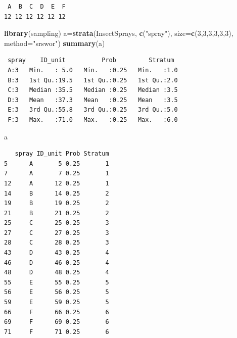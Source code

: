 \documentclass[12pt,brazil,oneside]{book}
\newenvironment{Shaded}{\begin{snugshade}}{\end{snugshade}}
\newcommand{\DataTypeTok}[1]{\textcolor[rgb]{0.13,0.29,0.53}{#1}}
\newcommand{\DecValTok}[1]{\textcolor[rgb]{0.00,0.00,0.81}{#1}}
\newcommand{\KeywordTok}[1]{\textcolor[rgb]{0.13,0.29,0.53}{\textbf{#1}}}
\newcommand{\NormalTok}[1]{#1}
\newcommand{\OperatorTok}[1]{\textcolor[rgb]{0.81,0.36,0.00}{\textbf{#1}}}
\newcommand{\StringTok}[1]{\textcolor[rgb]{0.31,0.60,0.02}{#1}}
\begin{document}
\begin{Shaded}
\end{Shaded}

\begin{verbatim}
 A  B  C  D  E  F 
12 12 12 12 12 12 
\end{verbatim}

\begin{Shaded}
\begin{Highlighting}[]
\KeywordTok{library}\NormalTok{(sampling)}
\NormalTok{a=}\KeywordTok{strata}\NormalTok{(InsectSprays, }\KeywordTok{c}\NormalTok{(}\StringTok{"spray"}\NormalTok{), }\DataTypeTok{size=}\KeywordTok{c}\NormalTok{(}\DecValTok{3}\NormalTok{,}\DecValTok{3}\NormalTok{,}\DecValTok{3}\NormalTok{,}\DecValTok{3}\NormalTok{,}\DecValTok{3}\NormalTok{,}\DecValTok{3}\NormalTok{), }\DataTypeTok{method=}\StringTok{"srswor"}\NormalTok{)}
\KeywordTok{summary}\NormalTok{(a)}
\end{Highlighting}
\end{Shaded}

\begin{verbatim}
 spray    ID_unit          Prob         Stratum   
 A:3   Min.   : 5.0   Min.   :0.25   Min.   :1.0  
 B:3   1st Qu.:19.5   1st Qu.:0.25   1st Qu.:2.0  
 C:3   Median :35.5   Median :0.25   Median :3.5  
 D:3   Mean   :37.3   Mean   :0.25   Mean   :3.5  
 E:3   3rd Qu.:55.8   3rd Qu.:0.25   3rd Qu.:5.0  
 F:3   Max.   :71.0   Max.   :0.25   Max.   :6.0  
\end{verbatim}

\begin{Shaded}
\begin{Highlighting}[]
\NormalTok{a}
\end{Highlighting}
\end{Shaded}

\begin{verbatim}
   spray ID_unit Prob Stratum
5      A       5 0.25       1
7      A       7 0.25       1
12     A      12 0.25       1
14     B      14 0.25       2
19     B      19 0.25       2
21     B      21 0.25       2
25     C      25 0.25       3
27     C      27 0.25       3
28     C      28 0.25       3
43     D      43 0.25       4
46     D      46 0.25       4
48     D      48 0.25       4
55     E      55 0.25       5
56     E      56 0.25       5
59     E      59 0.25       5
66     F      66 0.25       6
69     F      69 0.25       6
71     F      71 0.25       6
\end{verbatim}
\end{document}
